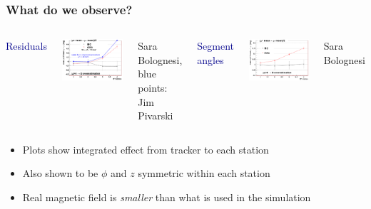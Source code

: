 \documentclass[compress]{beamer}
\begin{document}
\begin{frame}
\frametitle{What do we observe?}

\begin{columns}
\begin{center}
\textcolor{darkblue}{\large Residuals}
\end{center}

\includegraphics[height=3.5 cm]{sara_position_method_withalignment.png}

\hfill {\tiny Sara Bolognesi, blue points: Jim Pivarski}

\begin{center}
\textcolor{darkblue}{\large Segment angles}
\end{center}

\includegraphics[height=3.5 cm]{sara_angle_method.png}

\hfill {\tiny Sara Bolognesi}
\end{columns}

\vfill
\begin{itemize}
\item Plots show integrated effect from tracker to each station
\item Also shown to be $\phi$ and $z$ symmetric within each station
\item Real magnetic field is {\it smaller} than what is used in the simulation
\end{itemize}
\end{frame}
\end{document}
